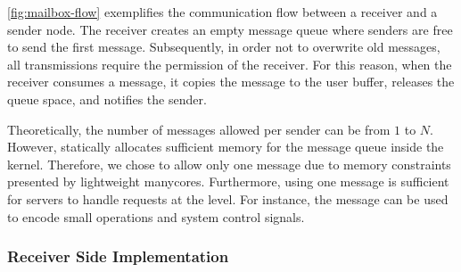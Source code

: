 
			\autoref{fig:mailbox-flow} exemplifies the communication flow between a
			receiver and a sender node. The receiver creates an empty message queue
			where senders are free to send the first message. Subsequently, in order
			not to overwrite old messages, all transmissions require the permission
			of the receiver. For this reason,  when the receiver consumes a message,
			it copies the message to the user buffer, releases the queue space, and
			notifies the sender.
			
			Theoretically, the number of messages allowed per sender can be from
			$1$ to $N$. However, \nanvix \hal statically allocates sufficient
			memory for the message queue inside the kernel. Therefore, we chose
			to allow only one message due to memory constraints presented by
			lightweight manycores. Furthermore, using one message is sufficient	for
			servers to handle requests at the \multikernel level. For instance, the
			message can be used to encode small operations and system control signals.
			
			\subsubsection{Receiver Side Implementation}


